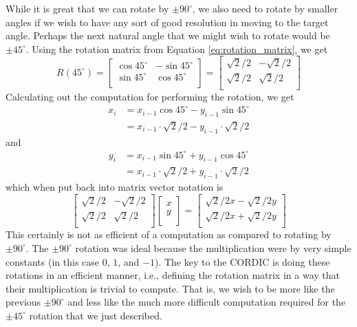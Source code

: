 While it is great that we can rotate by $\pm 90^\circ$, we also need to rotate by smaller angles if we wish to have any sort of good resolution in moving to the target angle. Perhaps the next natural angle that we might wish to rotate would be $\pm 45^\circ$. Using the rotation matrix from Equation \ref{eq:rotation_matrix}, we get
\begin{equation}
R(45^\circ) = \begin{bmatrix}
\cos 45^\circ & -\sin 45^\circ \\
\sin 45^\circ & \cos 45^\circ \\
\end{bmatrix} = \begin{bmatrix}
\sqrt 2/2 & -\sqrt 2/2 \\
\sqrt 2/2 & \sqrt 2/2 \\
\end{bmatrix}
\end{equation} Calculating out the computation for performing the rotation, we get
\begin{align}
x_i &= x_{i-1}  \cos 45^\circ - y_{i-1} \sin 45^\circ \nonumber \\
& = x_{i-1} \cdot \sqrt 2/2  - y_{i-1} \cdot \sqrt 2/2
\end{align} and 
\begin{align}
y_i &= x_{i-1} \sin  45^\circ + y_{i-1} \cos 45^\circ \nonumber \\
&= x_{i-1} \cdot \sqrt 2/2 + y_{i-1} \cdot \sqrt 2/2
\end{align} which when put back into matrix vector notation is
\begin{equation}
\begin{bmatrix}
\sqrt 2/2 & -\sqrt 2/2 \\
\sqrt 2/2 & \sqrt 2/2 \\
\end{bmatrix}
\begin{bmatrix}
x \\
y \\
\end{bmatrix}
= \begin{bmatrix}
\sqrt 2/2 x - \sqrt 2/2 y \\
\sqrt 2/2 x + \sqrt 2/2 y \\
\end{bmatrix} 
\end{equation}
This certainly is not as efficient of a computation as compared to rotating by $\pm 90^\circ$. The $\pm 90^\circ$ rotation was ideal because the multiplication were by very simple constants (in this case $0$, $1$, and $-1$). The key to the CORDIC is doing these rotations in an efficient manner, i.e., defining the rotation matrix in a way that their multiplication is trivial to compute. That is, we wish to be more like the previous $\pm 90^\circ$ and less like the much more difficult computation required for the $\pm 45^\circ$ rotation that we just described.

